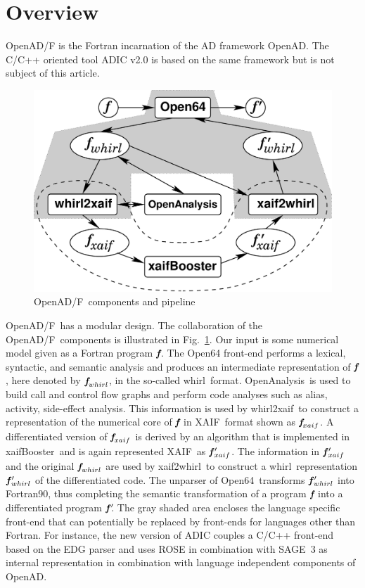 \documentclass{book}
\newcommand{\OpenADF}{OpenAD/F}
\newcommand{\OpenAD}{OpenAD}
\newcommand{\OpenAnalysis}{OpenAnalysis}
\newcommand{\OpenSixtyFour}{Open64}
\newcommand{\xaif}{XAIF}
\newcommand{\xaifBooster}{xaifBooster}
\newcommand{\whirl}{whirl}
\newcommand{\whirlToxaif}{whirl2xaif}
\newcommand{\xaifTowhirl}{xaif2whirl}
\newcommand{\bmf}{\mbox{\bf\em f}}
\newcommand{\bmfp}{\mbox{\bf\em f$\,^\prime\!\!$}}
\newcommand{\reffig}[1]{{Fig.~\ref{#1}}}
\begin{document}
\section{Overview}
\OpenADF \cite{openadWeb}
is the Fortran incarnation of the AD framework \OpenAD.
The C/C++ oriented tool ADIC v2.0 \cite{adicWeb}
is based on the same framework but is 
not subject of this article.
\begin{figure}
  \centering\includegraphics[width=.5\textwidth]{overview}
  \caption{\OpenADF\ components and pipeline} \label{fig:overview}
\end{figure}
\OpenADF\ has  a modular design. 
The collaboration  of the \OpenADF\ components is illustrated in 
\reffig{fig:overview}.
Our input is some numerical model given as a Fortran program 
$\bmf$.
The \OpenSixtyFour\cite{open64Web}
front-end performs a lexical, 
syntactic, and semantic analysis and produces an 
intermediate representation of $\bmf$, here denoted by $\bmf_{\whirl}$, 
in the so-called \whirl\ format.
\OpenAnalysis\ is used to build call and control flow graphs and  perform 
code analyses such as alias, activity, side-effect analysis.
This information is used by 
\whirlToxaif\ to construct a representation of the numerical core of $\bmf$ in
\xaif\ format shown as $\bmf_{xaif}$.  
A differentiated version of $\bmf_{xaif}$ is derived by an 
algorithm that is implemented in \xaifBooster\ and is again represented 
\xaif\ as $\bmfp_{xaif}$.
The information in $\bmfp_{xaif}$ and the original $\bmf_{\whirl}$ are used by 
\xaifTowhirl\ to construct a 
\whirl\ representation $\bmfp_{\whirl}$ of the differentiated code. 
The unparser of 
\OpenSixtyFour\ transforms $\bmfp_{\whirl}$ into Fortran90, thus completing
the semantic transformation of a program $\bmf$ into
a differentiated program $\bmfp$.
The gray shaded area encloses the language specific front-end that can potentially
be replaced by front-ends for languages other than Fortran. 
For instance, the new version of ADIC \cite{HoNo01} couples a C/C++ 
front-end 
based on the EDG parser \cite{edgWeb} and uses ROSE in combination with SAGE~3 \cite{roseWeb} 
as internal representation in combination with language independent components of \OpenAD.
\end{document}
